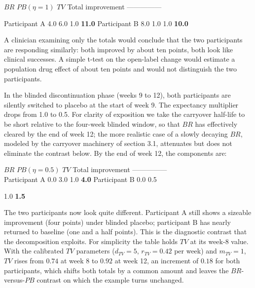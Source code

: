 \documentclass[
  11pt,
]{article}
\begin{document}
\textbar{} \(BR\) \textbar{} \(PB(\eta = 1)\) \textbar{} \(TV\) \textbar{} Total improvement \textbar{} \textbar---\textbar---\textbar---\textbar---\textbar---\textbar{} \textbar{}

Participant A \textbar{} 4.0 \textbar{} 6.0 \textbar{} 1.0 \textbar{} \textbf{11.0} \textbar{} \textbar{} Participant B \textbar{} 8.0 \textbar{} 1.0 \textbar{} 1.0
\textbar{} \textbf{10.0} \textbar{}

A clinician examining only the totals would conclude that the two participants
are responding similarly: both improved by about ten points, both look like
clinical successes. A simple t-test on the open-label change would estimate a
population drug effect of about ten points and would not distinguish the two
participants.

In the blinded discontinuation phase (weeks 9 to 12), both participants are
silently switched to placebo at the start of week 9. The expectancy multiplier
drops from 1.0 to 0.5. For clarity of exposition we take the carryover
half-life to be short relative to the four-week blinded window, so that \(BR\)
has effectively cleared by the end of week 12; the more realistic case of a
slowly decaying \(BR\), modeled by the carryover machinery of section 3.1,
attenuates but does not eliminate the contrast below. By the end of week 12,
the components are:

\textbar{} \(BR\) \textbar{} \(PB(\eta = 0.5)\) \textbar{} \(TV\) \textbar{} Total improvement \textbar{} \textbar---\textbar---\textbar---\textbar---\textbar---\textbar{}\\
Participant A \textbar{} 0.0 \textbar{} 3.0 \textbar{} 1.0 \textbar{} \textbf{4.0} \textbar{} \textbar{} Participant B \textbar{} 0.0 \textbar{} 0.5 \textbar{}

1.0 \textbar{} \textbf{1.5} \textbar{}

The two participants now look quite different. Participant A still shows a
sizeable improvement (four points) under blinded placebo; participant B has
nearly returned to baseline (one and a half points). This is the diagnostic
contrast that the decomposition exploits. For simplicity the table holds \(TV\)
at its week-8 value. With the calibrated \(TV\) parameters (\(d_{TV} = 5\),
\(r_{TV} = 0.42\) per week) and \(m_{TV} = 1\), \(TV\) rises from \(0.74\) at week
8 to \(0.92\) at week 12, an increment of \(0.18\) for both participants,
which shifts both totals by a common amount and leaves the
\(BR\)-versus-\(PB\) contrast on which the example turns unchanged.
\end{document}
